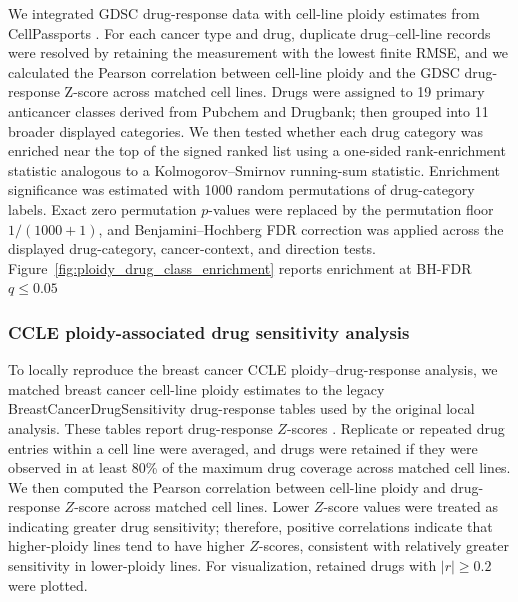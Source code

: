 \documentclass[11pt,notitlepage]{article}
\begin{document}
  We integrated GDSC drug-response data \cite{yang_genomics_2013} with cell-line ploidy estimates from CellPassports \cite{vandermeer_cell_2018}. For each cancer type and drug, duplicate
  drug--cell-line records were resolved by retaining the measurement with the lowest finite RMSE, and we calculated the Pearson correlation between cell-line ploidy and the GDSC drug-
  response Z-score across matched cell lines. Drugs were assigned to 19 primary anticancer classes derived from Pubchem \cite{xx} and Drugbank; then grouped into 11 broader displayed categories. We then tested whether each drug category was enriched near the top of the signed ranked list using a one-sided rank-enrichment statistic analogous to a
  Kolmogorov--Smirnov running-sum statistic. Enrichment significance was estimated with 1000 random permutations of drug-category labels. Exact zero permutation \(p\)-values were replaced by
  the permutation floor \(1/(1000+1)\), and Benjamini--Hochberg FDR correction was applied across the displayed drug-category, cancer-context, and direction tests.
  Figure~\ref{fig:ploidy_drug_class_enrichment} reports enrichment at BH-FDR \(q \leq 0.05\)



\subsubsection{CCLE ploidy-associated drug sensitivity analysis}  \label{sec:methods-ccle}
  To locally reproduce the breast cancer CCLE ploidy--drug-response analysis, we matched breast cancer cell-line ploidy estimates to the legacy BreastCancerDrugSensitivity drug-response
  tables used by the original local analysis. These tables report drug-response \(Z\)-scores \cite{barretina_cancer_2012,ghandi_next-
  generation_2019,kimmel_integrating_2020}. Replicate or repeated drug entries within a cell line were averaged, and drugs were retained if they were observed in at least 80\% of the
  maximum drug coverage across matched cell lines. We then computed the Pearson correlation between cell-line ploidy and drug-response \(Z\)-score across matched cell lines. Lower
  \(Z\)-score values were treated as indicating greater drug sensitivity; therefore, positive correlations indicate that higher-ploidy lines tend to have higher \(Z\)-scores, consistent
  with relatively greater sensitivity in lower-ploidy lines. For visualization, retained drugs with \(|r| \geq 0.2\) were plotted.
\end{document}
